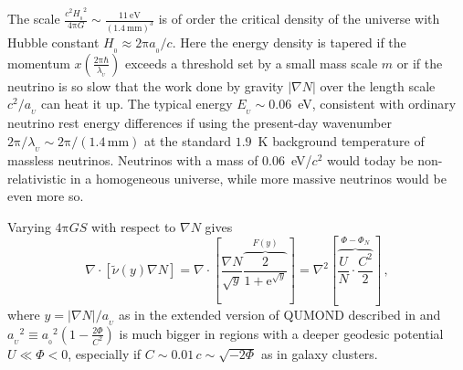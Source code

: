 \documentclass[fleqn,usenatbib,useAMS,onecolumn]{mnras} %
\begin{document}
The scale $\frac{c^2 {H_{_0}}^2}{4 \mathrm{\pi} G} \sim  \frac{11~\mathrm{eV}}{(1.4~\mathrm{mm})^3}$ is of order the critical density of the universe with Hubble constant $H_{_0} \approx 2 \mathrm{\pi} a_{_0}/c$. Here the energy density is tapered if the momentum $x \left( \frac{2\mathrm{\pi}\hbar}{\lambda_{_U}} \right)$ exceeds a threshold set by a small mass scale $m$ or if the neutrino is so slow that the work done by gravity $\left| \nabla N \right|$ over the length scale $c^2/a_{_U}$ can heat it up. The typical energy $E_{_U} \sim 0.06$~eV, consistent with ordinary neutrino rest energy differences if using the present-day wavenumber $2\mathrm{\pi}/\lambda_{_U} \sim 2\mathrm{\pi}/\left( 1.4 \, \text{mm} \right)$ at the standard $1.9$~K background temperature of massless neutrinos. Neutrinos with a mass of 0.06~eV/$c^2$ would today be non-relativistic in a homogeneous universe, while more massive neutrinos would be even more so.


Varying $4 \mathrm{\pi} G S$ with respect to $\nabla N$ gives
\begin{equation}
    \nabla \cdot 
    \left[ {\widetilde{\nu}(y)\nabla N }\right] = \nabla \cdot \left[\frac{\nabla N}{\sqrt{y}} \overbrace{ \frac{2}{1 + \mathrm{e}^{\sqrt{y}}} }^{F(y)} \right] = \nabla^2 \left[\overbrace{\frac{U}{N} \cdot \frac{C^2}{2}}^{\Phi-\Phi_N} \right] \, ,
    \label{FDMOND}
\end{equation}
where $y = \left| \nabla N \right|/a_{_U}$ as in the extended version of QUMOND described in \citet{Zhao_2012} and ${a_{_U}}^2 \equiv {a_{_0}}^2 \left( 1 - \frac{2\Phi}{C^2} \right)$ is much bigger in regions with a deeper geodesic potential $U \ll \Phi < 0$, especially if $C \sim 0.01 \, c \sim \sqrt{-2\Phi}$ as in galaxy clusters.
\end{document}
